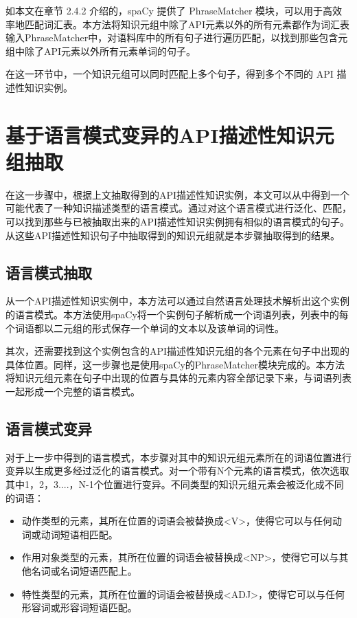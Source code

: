 如本文在章节 2.4.2 介绍的，spaCy 提供了 PhraseMatcher 模块，可以用于高效率地匹配词汇表。本方法将知识元组中除了API元素以外的所有元素都作为词汇表输入PhraseMatcher中，对语料库中的所有句子进行遍历匹配，以找到那些包含元组中除了API元素以外所有元素单词的句子。

在这一环节中，一个知识元组可以同时匹配上多个句子，得到多个不同的 API 描述性知识实例。

\section{基于语言模式变异的API描述性知识元组抽取}
在这一步骤中，根据上文抽取得到的API描述性知识实例，本文可以从中得到一个可能代表了一种知识描述类型的语言模式。通过对这个语言模式进行泛化、匹配，可以找到那些与已被抽取出来的API描述性知识实例拥有相似的语言模式的句子。从这些API描述性知识句子中抽取得到的知识元组就是本步骤抽取得到的结果。

\subsection{语言模式抽取}
从一个API描述性知识实例中，本方法可以通过自然语言处理技术解析出这个实例的语言模式。本方法使用spaCy将一个实例句子解析成一个词语列表，列表中的每个词语都以二元组的形式保存一个单词的文本以及该单词的词性。

其次，还需要找到这个实例包含的API描述性知识元组的各个元素在句子中出现的具体位置。同样，这一步骤也是使用spaCy的PhraseMatcher模块完成的。本方法将知识元组元素在句子中出现的位置与具体的元素内容全部记录下来，与词语列表一起形成一个完整的语言模式。

\subsection{语言模式变异}
对于上一步中得到的语言模式，本步骤对其中的知识元组元素所在的词语位置进行变异以生成更多经过泛化的语言模式。对一个带有N个元素的语言模式，依次选取其中1，2，3....，N-1个位置进行变异。不同类型的知识元组元素会被泛化成不同的词语：

\begin{itemize}
    \item 动作类型的元素，其所在位置的词语会被替换成<V>，使得它可以与任何动词或动词短语相匹配。
    \item 作用对象类型的元素，其所在位置的词语会被替换成<NP>，使得它可以与其他名词或名词短语匹配上。
    \item 特性类型的元素，其所在位置的词语会被替换成<ADJ>，使得它可以与任何形容词或形容词短语匹配。
\end{itemize}

